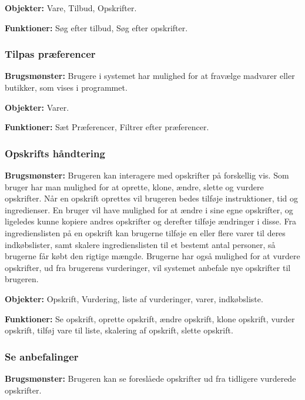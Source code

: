 \textbf{Objekter:} Vare, Tilbud, Opskrifter.

\textbf{Funktioner:} Søg efter tilbud, Søg efter opskrifter.

\subsubsection*{Tilpas præferencer}
\textbf{Brugsmønster:} 
Brugere i systemet har mulighed for at fravælge madvarer eller butikker, som vises i programmet.

\textbf{Objekter:} Varer.

\textbf{Funktioner:} Sæt Præferencer, Filtrer efter præferencer.

\subsubsection*{Opskrifts håndtering}
\textbf{Brugsmønster:}
Brugeren kan interagere med opskrifter på forskellig vis. 
Som bruger har man mulighed for at oprette, klone, ændre, slette og vurdere opskrifter.
Når en opskrift oprettes vil brugeren bedes tilføje instruktioner, tid og ingredienser.
En bruger vil have mulighed for at ændre i sine egne opskrifter, og ligeledes kunne kopiere andres opskrifter og derefter tilføje ændringer i disse.
Fra ingredienslisten på en opskrift kan brugerne tilføje en eller flere varer til deres indkøbslister, samt skalere ingredienslisten til et bestemt antal personer, så brugerne får købt den rigtige mængde.
Brugerne har også mulighed for at vurdere opskrifter, ud fra brugerens vurderinger, vil systemet anbefale nye opskrifter til brugeren.

\textbf{Objekter:} Opskrift, Vurdering, liste af vurderinger, varer, indkøbsliste.

\textbf{Funktioner:} Se opskrift, oprette opskrift, ændre opskrift, klone opskrift, vurder opskrift, tilføj vare til liste, skalering af opskrift, slette opskrift.

%
%

\subsubsection*{Se anbefalinger}
\textbf{Brugsmønster:} Brugeren kan se foreslåede opskrifter ud fra tidligere vurderede opskrifter.


